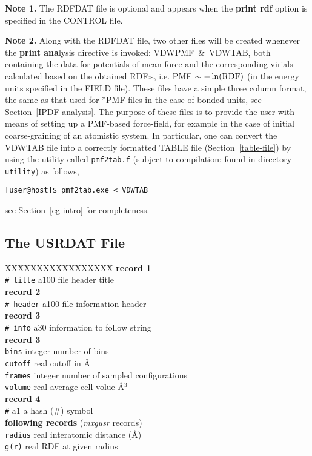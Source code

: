 {\bf Note 1.} The RDFDAT file is optional and appears when the
{\bf print rdf} option is specified in the CONTROL file.

{\bf Note 2.} Along with the RDFDAT file, two other files will
be created whenever the {\bf print ana}lysis directive is invoked:
VDWPMF~\&~VDWTAB, both containing the data for potentials of mean
force and the corresponding virials calculated based on the obtained
RDF:s, i.e. PMF $\sim -\ln({\rm RDF})$ (in the energy units specified
in the FIELD file).  These files have a simple three column format,
the same as that used for *PMF files in the case of bonded units,
see Section~\ref{IPDF-analysis}.  The purpose of these files is to
provide the user with means of setting up a PMF-based force-field,
for example in the case of initial coarse-graining of
an atomistic system.  In particular, one can convert the VDWTAB file
into a correctly formatted TABLE file (Section~\ref{table-file})
by using the utility called {\tt pmf2tab.f} (subject to compilation;
found in \D directory {\tt utility}) as follows,

{\tt [user@host]\$ pmf2tab.exe < VDWTAB}


see Section~\ref{cg-intro} for completeness.

\subsection{The USRDAT File}
\label{usr-file}

\begin{tabbing}
X\=XXXXXXXX\=XXXXXXXX\=\kill
{\bf record 1} \\
\> {\tt \# title}  \> a100    \> file header title \\
{\bf record 2} \\
\> {\tt \# header} \> a100    \> file information header \\
{\bf record 3} \\
\> {\tt \# info}   \> a30     \> information to follow string \\
{\bf record 3} \\
\> {\tt bins}      \> integer \> number of bins \\
\> {\tt cutoff}    \> real    \> cutoff in \AA \\
\> {\tt frames}    \> integer \> number of sampled configurations \\
\> {\tt volume}    \> real    \> average cell volue \AA$^{3}$ \\
{\bf record 4} \\
\> {\tt \#}        \> a1      \> a hash (\#) symbol \\
{\bf following records} ({\em mxgusr} records) \\
\> {\tt radius}    \> real    \> interatomic distance (\AA) \\
\> {\tt g(r)}      \> real    \> RDF at given radius
\end{tabbing}

